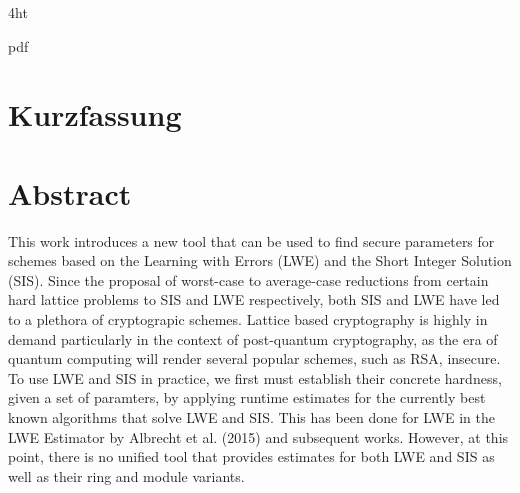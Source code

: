 \documentclass[
  a4paper,  %
  twoside,  %
  bibliography=totoc,
  headsepline,
  cleardoublepage=empty,
  parskip=half,
  draft=false
]{scrbook}
\begin{document}
\iftex4ht

  {pdf}
  {%
  }
\fi



\Titelblatt

\pagestyle{preamble}
\renewcommand*{\chapterpagestyle}{preamble}



\ifdeutsch
  \section*{Kurzfassung}
\else
  \section*{Abstract}
\fi

This work introduces a new tool that can be used to find secure parameters for schemes based on the Learning with Errors (LWE) and the Short Integer Solution (SIS). Since the proposal of worst-case to average-case reductions from certain hard lattice problems to SIS and LWE respectively, both SIS and LWE have led to a plethora of cryptograpic schemes. Lattice based cryptography is highly in demand particularly in the context of post-quantum cryptography, as the era of quantum computing will render several popular schemes, such as RSA, insecure. To use LWE and SIS in practice, we first must establish their concrete hardness, given a set of paramters, by applying runtime estimates for the currently best known algorithms that solve LWE and SIS. This has been done for LWE in the LWE Estimator by Albrecht et al. (2015) and subsequent works. However, at this point, there is no unified tool that provides estimates for both LWE and SIS as well as their ring and module variants.
\end{document}
